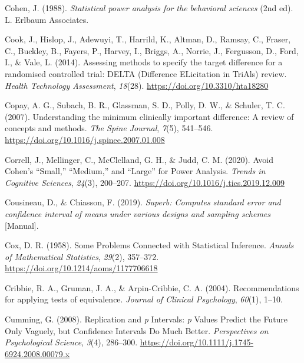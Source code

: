 \documentclass[
  letterpaper,
  DIV=11,
  numbers=noendperiod]{scrreprt}
\newlength{\cslhangindent}
\newlength{\cslentryspacingunit} %
\newenvironment{CSLReferences}[2] %
 {%
  \setlength{\parindent}{0pt}
  \ifodd #1
  \let\oldpar\par
  \def\par{\hangindent=\cslhangindent\oldpar}
  \fi
  \setlength{\parskip}{#2\cslentryspacingunit}
 }%
 {}
\begin{document}
\begin{CSLReferences}{1}{0}
\leavevmode{}%
Cohen, J. (1988). \emph{Statistical power analysis for the behavioral
sciences} (2nd ed). {L. Erlbaum Associates}.

\leavevmode{}%
Cook, J., Hislop, J., Adewuyi, T., Harrild, K., Altman, D., Ramsay, C.,
Fraser, C., Buckley, B., Fayers, P., Harvey, I., Briggs, A., Norrie, J.,
Fergusson, D., Ford, I., \& Vale, L. (2014). Assessing methods to
specify the target difference for a randomised controlled trial: {DELTA}
({Difference ELicitation} in {TriAls}) review. \emph{Health Technology
Assessment}, \emph{18}(28). \url{https://doi.org/10.3310/hta18280}

\leavevmode{}%
Copay, A. G., Subach, B. R., Glassman, S. D., Polly, D. W., \& Schuler,
T. C. (2007). Understanding the minimum clinically important difference:
A review of concepts and methods. \emph{The Spine Journal}, \emph{7}(5),
541--546. \url{https://doi.org/10.1016/j.spinee.2007.01.008}

\leavevmode{}%
Correll, J., Mellinger, C., McClelland, G. H., \& Judd, C. M. (2020).
Avoid {Cohen}'s {``{Small},''} {``{Medium},''} and {``{Large}''} for
{Power Analysis}. \emph{Trends in Cognitive Sciences}, \emph{24}(3),
200--207. \url{https://doi.org/10.1016/j.tics.2019.12.009}

\leavevmode{}%
Cousineau, D., \& Chiasson, F. (2019). \emph{Superb: {Computes} standard
error and confidence interval of means under various designs and
sampling schemes} {[}Manual{]}.

\leavevmode{}%
Cox, D. R. (1958). Some {Problems Connected} with {Statistical
Inference}. \emph{Annals of Mathematical Statistics}, \emph{29}(2),
357--372. \url{https://doi.org/10.1214/aoms/1177706618}

\leavevmode{}%
Cribbie, R. A., Gruman, J. A., \& Arpin-Cribbie, C. A. (2004).
Recommendations for applying tests of equivalence. \emph{Journal of
Clinical Psychology}, \emph{60}(1), 1--10.

\leavevmode{}%
Cumming, G. (2008). Replication and {\emph{p}} {Intervals}: {\emph{p}}
{Values Predict} the {Future Only Vaguely}, but {Confidence Intervals Do
Much Better}. \emph{Perspectives on Psychological Science}, \emph{3}(4),
286--300. \url{https://doi.org/10.1111/j.1745-6924.2008.00079.x}


\end{CSLReferences}
\end{document}
